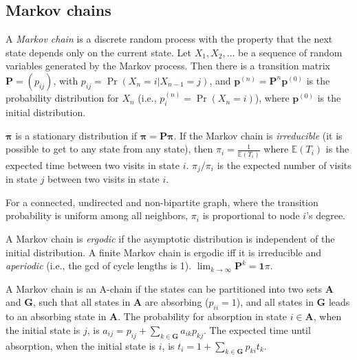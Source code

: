 \begin{multicols}{\Columns}
\subsection{Markov chains}
A \emph{Markov chain} is a discrete random process with the property that the next state depends only on the current state.
Let $X_1,X_2,\ldots$ be a sequence of random variables generated by the Markov process.
Then there is a transition matrix $\mathbf{P} = (p_{ij})$, with $p_{ij} = \Pr(X_n = i | X_{n-1} = j)$,
and $\mathbf{p}^{(n)} = \mathbf P^n \mathbf p^{(0)}$ is the probability distribution for $X_n$ (i.e., $p^{(n)}_i = \Pr(X_n = i)$),
where $\mathbf{p}^{(0)}$ is the initial distribution.

$\mathbf{\pi}$ is a stationary distribution if $\mathbf{\pi} = \mathbf{P \pi}$.
If the Markov chain is \emph{irreducible} (it is possible to get to any state from any state),
then $\pi_i = \frac{1}{\mathbb{E}(T_i)}$ where $\mathbb{E}(T_i)$  is the expected time between two visits in state $i$.
$\pi_j/\pi_i$ is the expected number of visits in state $j$ between two visits in state $i$.

For a connected, undirected and non-bipartite graph, where the transition probability is uniform among all neighbors, $\pi_i$ is proportional to node $i$'s degree.

A Markov chain is \emph{ergodic} if the asymptotic distribution is independent of the initial distribution.
A finite Markov chain is ergodic iff it is irreducible and \emph{aperiodic} (i.e., the gcd of cycle lengths is 1).
$\lim_{k\rightarrow\infty}\mathbf{P}^k = \mathbf{1}\pi$.

A Markov chain is an A-chain if the states can be partitioned into two sets $\mathbf{A}$ and $\mathbf{G}$, such that all states in $\mathbf{A}$ are absorbing ($p_{ii}=1$), and all states in $\mathbf{G}$ leads to an absorbing state in $\mathbf{A}$.
The probability for absorption in state $i\in\mathbf{A}$, when the initial state is $j$, is $a_{ij} = p_{ij}+\sum_{k\in\mathbf{G}} a_{ik}p_{kj}$.
The expected time until absorption, when the initial state is $i$, is $t_i = 1+\sum_{k\in\mathbf{G}}p_{ki}t_k$.


\end{multicols}
